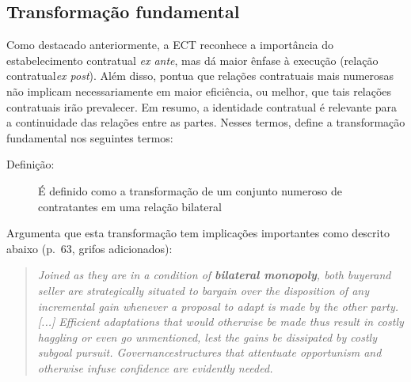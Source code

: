 \subsection*{Transformação fundamental}

Como destacado anteriormente, a ECT reconhece a importância do estabelecimento contratual \textit{ex ante}, mas dá maior ênfase à execução (relação contratual\textit{ex post}). Além disso, pontua que relações contratuais mais numerosas não implicam necessariamente em maior eficiência, ou melhor, que tais relações contratuais irão prevalecer. Em resumo, a identidade contratual é relevante para a continuidade das relações entre as partes. Nesses termos, define a transformação fundamental nos seguintes termos:

\begin{description}
	\item[Definição:] É definido como a transformação de um conjunto numeroso de contratantes em uma relação bilateral
\end{description}
Argumenta que esta transformação tem implicações importantes como descrito abaixo (p.~63, grifos adicionados):

\begin{quotation}
	\textit{
	Joined as they are in a condition of \textbf{bilateral monopoly}, both buyerand seller are strategically situated to bargain over the disposition of any incremental gain whenever a proposal to adapt is made by the other party. [...]
	Efficient adaptations that would otherwise be made thus result in costly haggling or even go unmentioned, lest the gains be dissipated by costly	subgoal pursuit. Governancestructures that attentuate opportunism and otherwise infuse confidence are evidently needed.
	}
\end{quotation}
